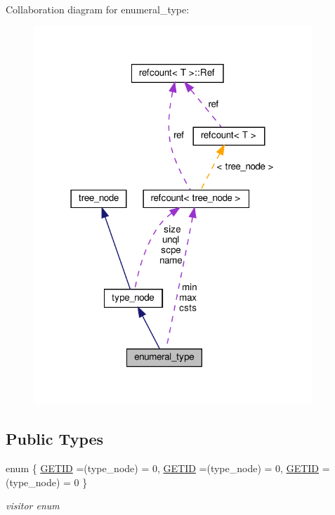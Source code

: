 Collaboration diagram for enumeral\+\_\+type\+:
\nopagebreak
\begin{figure}[H]
\begin{center}
\leavevmode
\includegraphics[width=297pt]{db/db5/structenumeral__type__coll__graph}
\end{center}
\end{figure}
\subsection*{Public Types}
\begin{DoxyCompactItemize}
\item 
enum \{ \hyperlink{structenumeral__type_a39f0ae0bd118170b222f484b312d250daa6f63e7dd9067e1012c6a2c7a2617dd6}{G\+E\+T\+ID} =(type\+\_\+node) = 0, 
\hyperlink{structenumeral__type_a39f0ae0bd118170b222f484b312d250daa6f63e7dd9067e1012c6a2c7a2617dd6}{G\+E\+T\+ID} =(type\+\_\+node) = 0, 
\hyperlink{structenumeral__type_a39f0ae0bd118170b222f484b312d250daa6f63e7dd9067e1012c6a2c7a2617dd6}{G\+E\+T\+ID} =(type\+\_\+node) = 0
 \}\begin{DoxyCompactList}\small\item\em visitor enum \end{DoxyCompactList}
\end{DoxyCompactItemize}
